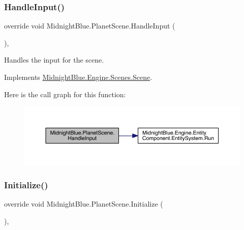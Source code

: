 \hypertarget{class_midnight_blue_1_1_planet_scene_a6c84a639f27b9f7510b514969d47d1bd}{}\label{class_midnight_blue_1_1_planet_scene_a6c84a639f27b9f7510b514969d47d1bd} 
\subsubsection{\texorpdfstring{Handle\+Input()}{HandleInput()}}
{\footnotesize\ttfamily override void Midnight\+Blue.\+Planet\+Scene.\+Handle\+Input (\begin{DoxyParamCaption}{ }\end{DoxyParamCaption})\hspace{0.3cm}{\ttfamily [inline]}, {\ttfamily [virtual]}}



Handles the input for the scene. 



Implements \hyperlink{class_midnight_blue_1_1_engine_1_1_scenes_1_1_scene_a2f7849ef8976f9aeed0023448033b6fd}{Midnight\+Blue.\+Engine.\+Scenes.\+Scene}.

Here is the call graph for this function\+:
\nopagebreak
\begin{figure}[H]
\begin{center}
\leavevmode
\includegraphics[width=350pt]{class_midnight_blue_1_1_planet_scene_a6c84a639f27b9f7510b514969d47d1bd_cgraph}
\end{center}
\end{figure}
\hypertarget{class_midnight_blue_1_1_planet_scene_ac8b7e88283b22b87aa45f116b549e86f}{}\label{class_midnight_blue_1_1_planet_scene_ac8b7e88283b22b87aa45f116b549e86f} 
\subsubsection{\texorpdfstring{Initialize()}{Initialize()}}
{\footnotesize\ttfamily override void Midnight\+Blue.\+Planet\+Scene.\+Initialize (\begin{DoxyParamCaption}{ }\end{DoxyParamCaption})\hspace{0.3cm}{\ttfamily [inline]}, {\ttfamily [virtual]}}



